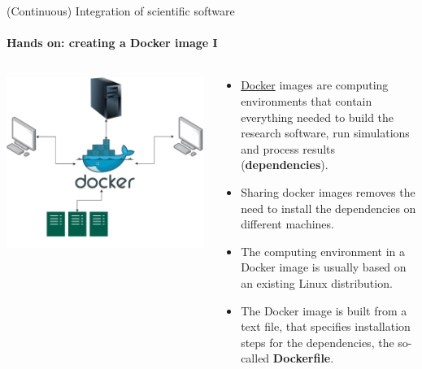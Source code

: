\begin{frame}{(Continuous) Integration of scientific software} 
    \framesubtitle{Hands on: creating a Docker image I} 
    \vfill

    \begin{columns}
        \begin{column}[c]{0.5\textwidth}
            \centering
            \includegraphics[width=0.8\columnwidth]{figures/docker-description.pdf}
        \end{column}
        \begin{column}[c]{0.5\textwidth}

            \begin{itemize}
                \item \href{https://docs.docker.com/}{Docker} images are computing environments that contain everything needed to build the research software, run simulations and process results (\textbf{dependencies}). 
                \item Sharing docker images removes the need to install the dependencies on different machines. 
                \item The computing environment in a Docker image is usually based on an existing Linux distribution. 
                \item The Docker image is built from a text file, that specifies installation steps for the dependencies, the so-called \textbf{Dockerfile}.
            \end{itemize}
        \end{column}
    \end{columns}
\end{frame}

